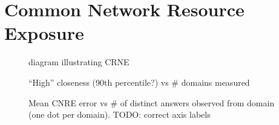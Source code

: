 \section{Common Network Resource Exposure} \label{sect:crne}

\begin{figure}
    \caption{diagram illustrating CRNE}
\end{figure}

\begin{figure}
    \caption{“High” closeness (90th percentile?) vs \# domains measured}
\end{figure}

\begin{figure}
    \caption{Mean CNRE error vs \# of distinct answers observed from domain (one dot per domain). TODO: correct axis labels}
\end{figure}

